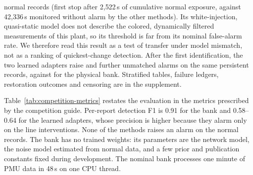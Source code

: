 normal records (first stop after 2{,}522\,s of cumulative normal exposure,
against 42{,}336\,s monitored without alarm by the other methods). Its
white-injection, quasi-static model does not describe the colored,
dynamically filtered measurements of this plant, so its threshold is far
from its nominal false-alarm rate. We therefore read this result as a test
of transfer under model mismatch, not as a ranking of quickest-change
detection. After the first identification, the two learned adapters raise
\PersistETExtras{} and \PersistShortExtras{} further unmatched alarms on the
same persistent records, against \PersistPhysicalExtras{} for the
physical bank. Stratified tables, failure ledgers, restoration outcomes and
censoring are in the supplement.

Table~\ref{tab:competition-metrics} restates the evaluation in the metrics
prescribed by the competition guide. Per-report detection F1 is 0.91 for
the bank and 0.58--0.64 for the learned adapters, whose precision is higher
because they alarm only on the line interventions. None of the methods
raises an alarm on the normal records. The bank has no trained weights:
its parameters are the network model, the noise model estimated from normal
data, and a few prior and publication constants fixed during
development. The nominal bank processes one
minute of PMU data in 48\,s on one CPU thread.

